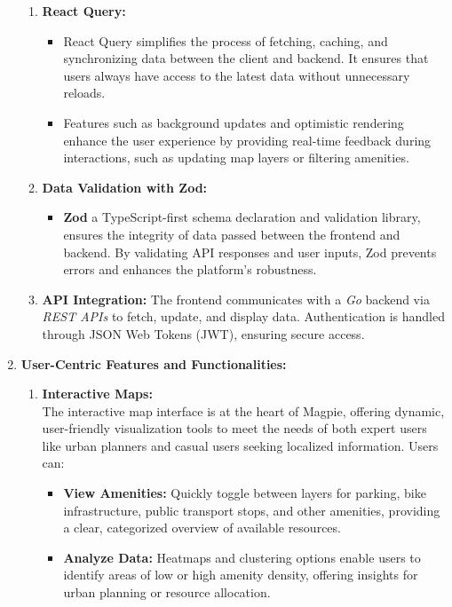 \begin{enumerate}
\begin{enumerate}
        \item \textbf{React Query:}\\
        \begin{itemize}
            \item React Query simplifies the process of fetching, caching, and synchronizing data between the client and backend. It ensures that users always have access to the latest data without unnecessary reloads.
            \item Features such as background updates and optimistic rendering enhance the user experience by providing real-time feedback during interactions, such as updating map layers or filtering amenities.
        \end{itemize}
        \item \textbf{Data Validation with Zod:}\\
        \begin{itemize}
            \item \textbf{Zod} a TypeScript-first schema declaration and validation library, ensures the integrity of data passed between the frontend and backend. By validating API responses and user inputs, Zod prevents errors and enhances the platform's robustness.
        \end{itemize}
        \item  \textbf{API Integration:}
        The frontend communicates with a \emph{Go} backend via \emph{REST APIs} to fetch, update, and display data. Authentication is handled through JSON Web Tokens (JWT), ensuring secure access.
    \end{enumerate}
    \item \textbf{User-Centric Features and Functionalities:}
    \begin{enumerate}
        \item \textbf{Interactive Maps:}\\
        The interactive map interface is at the heart of Magpie, offering dynamic, user-friendly visualization tools to meet the needs of both expert users like urban planners and casual users seeking localized information. Users can:
        \begin{itemize}
            \item \textbf{View Amenities:} Quickly toggle between layers for parking, bike infrastructure, public transport stops, and other amenities, providing a clear, categorized overview of available resources.
            \item \textbf{Analyze Data:} Heatmaps and clustering options enable users to identify areas of low or high amenity density, offering insights for urban planning or resource allocation.

\end{itemize}
\end{enumerate}
\end{enumerate}

